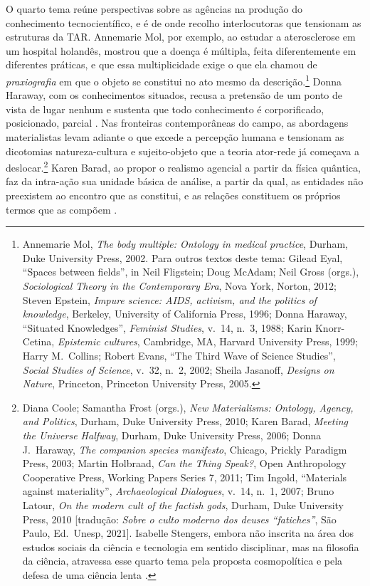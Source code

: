 O quarto tema reúne perspectivas sobre as agências na produção do conhecimento tecnocientífico, e é de onde recolho interlocutoras que tensionam as estruturas da TAR. Annemarie Mol, por exemplo, ao estudar a aterosclerose em um hospital holandês, mostrou que a doença é múltipla, feita diferentemente em diferentes práticas, e que essa multiplicidade exige o que ela chamou de \textit{praxiografia} em que o objeto se constitui no ato mesmo da descrição.\footnote{Annemarie Mol, \textit{The body multiple: Ontology in medical practice}, Durham, Duke University Press, 2002. Para outros textos deste tema: Gilead Eyal, \enquote{Spaces between fields}, in Neil Fligstein; Doug McAdam; Neil Gross (orgs.), \textit{Sociological Theory in the Contemporary Era}, Nova York, Norton, 2012; Steven Epstein, \textit{Impure science: AIDS, activism, and the politics of knowledge}, Berkeley, University of California Press, 1996; Donna Haraway, \enquote{Situated Knowledges}, \textit{Feminist Studies}, v.~14, n.~3, 1988; Karin Knorr-Cetina, \textit{Epistemic cultures}, Cambridge, MA, Harvard University Press, 1999; Harry M.~Collins; Robert Evans, \enquote{The Third Wave of Science Studies}, \textit{Social Studies of Science}, v.~32, n.~2, 2002; Sheila Jasanoff, \textit{Designs on Nature}, Princeton, Princeton University Press, 2005.} Donna Haraway, com os conhecimentos situados, recusa a pretensão de um ponto de vista de lugar nenhum e sustenta que todo conhecimento é corporificado, posicionado, parcial \parencite{Haraway1991Situated}. Nas fronteiras contemporâneas do campo, as abordagens materialistas levam adiante o que excede a percepção humana e tensionam as dicotomias natureza-cultura e sujeito-objeto que a teoria ator-rede já começava a deslocar.\footnote{Diana Coole; Samantha Frost (orgs.), \textit{New Materialisms: Ontology, Agency, and Politics}, Durham, Duke University Press, 2010; Karen Barad, \textit{Meeting the Universe Halfway}, Durham, Duke University Press, 2006; Donna J.~Haraway, \textit{The companion species manifesto}, Chicago, Prickly Paradigm Press, 2003; Martin Holbraad, \textit{Can the Thing Speak?}, Open Anthropology Cooperative Press, Working Papers Series 7, 2011; Tim Ingold, \enquote{Materials against materiality}, \textit{Archaeological Dialogues}, v.~14, n.~1, 2007; Bruno Latour, \textit{On the modern cult of the factish gods}, Durham, Duke University Press, 2010 [tradução: \textit{Sobre o culto moderno dos deuses \enquote{fatiches}}, São Paulo, Ed.~Unesp, 2021]. Isabelle Stengers, embora não inscrita na área dos estudos sociais da ciência e tecnologia em sentido disciplinar, mas na filosofia da ciência, atravessa esse quarto tema pela proposta cosmopolítica e pela defesa de uma ciência lenta \parencite{stengers2010cosmopolitics1, stengers2018another}.} Karen Barad, ao propor o realismo agencial a partir da física quântica, faz da intra-ação sua unidade básica de análise, a partir da qual, as entidades não preexistem ao encontro que as constitui, e as relações constituem os próprios termos que as compõem \parencite{Barad2007Meeting}.

